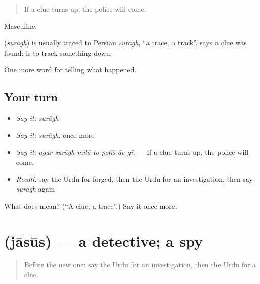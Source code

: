 \begin{quote}
If a clue turns up, the police will come.
\end{quote}

Masculine.

\begin{cousinweb}
\textbf{} (\emph{surāgh}) is usually traced to Persian \emph{surāgh}, \textquotedblleft{}a trace, a track\textquotedblright{}. \textbf{ } says a clue was found; \textbf{ } is to track something down.
\end{cousinweb}

\begin{grammarlens}[title={What you've built}]
One more word for telling what happened.
\end{grammarlens}

\subsection*{Your turn}
\begin{itemize}
\raggedright
  \item \emph{Say it:} \emph{surāgh}
  \item \emph{Say it:} \emph{surāgh}, once more
  \item \emph{Say it:} \emph{agar surāgh milā to polīs āe gī.} — If a clue turns up, the police will come.
  \item \emph{Recall:} say the Urdu for forged, then the Urdu for an investigation, then say \emph{surāgh} again
\end{itemize}

\begin{tcolorbox}[breakable,colback=teal!4,colframe=teal!35!black,title={Before you move on}]
What does  mean? (\textquotedblleft{}A clue; a trace\textquotedblright{}.) Say it once more.
\end{tcolorbox}
\section[\texorpdfstring{\ur{جاسوس} (jāsūs)}{جاسوس (jāsūs)}]{ (jāsūs) — a detective; a spy}

\label{lesson:UR-C282-jasus}



\begin{quote}
Before the new one: say the Urdu for an investigation, then the Urdu for a clue.
\end{quote}

